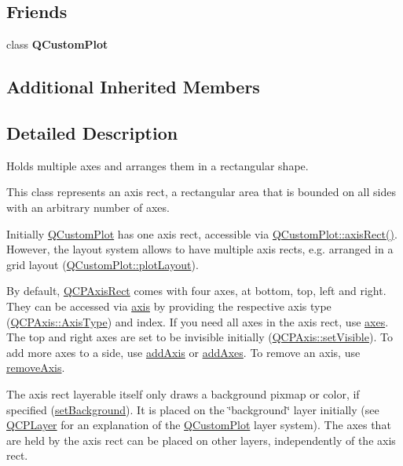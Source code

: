 \subsection*{Friends}
\begin{DoxyCompactItemize}
\item 
\mbox{\label{classQCPAxisRect_a1cdf9df76adcfae45261690aa0ca2198}} 
class {\bfseries Q\+Custom\+Plot}
\end{DoxyCompactItemize}
\subsection*{Additional Inherited Members}


\subsection{Detailed Description}
Holds multiple axes and arranges them in a rectangular shape. 

This class represents an axis rect, a rectangular area that is bounded on all sides with an arbitrary number of axes.

Initially \hyperlink{classQCustomPlot}{Q\+Custom\+Plot} has one axis rect, accessible via \hyperlink{classQCustomPlot_ae5eefcb5f6ca26689b1fd4f6e25b42f9}{Q\+Custom\+Plot\+::axis\+Rect()}. However, the layout system allows to have multiple axis rects, e.\+g. arranged in a grid layout (\hyperlink{classQCustomPlot_af1a1f1f571237deb7c2bd34a5e9f018f}{Q\+Custom\+Plot\+::plot\+Layout}).

By default, \hyperlink{classQCPAxisRect}{Q\+C\+P\+Axis\+Rect} comes with four axes, at bottom, top, left and right. They can be accessed via \hyperlink{classQCPAxisRect_a583ae4f6d78b601b732183f6cabecbe1}{axis} by providing the respective axis type (\hyperlink{classQCPAxis_ae2bcc1728b382f10f064612b368bc18a}{Q\+C\+P\+Axis\+::\+Axis\+Type}) and index. If you need all axes in the axis rect, use \hyperlink{classQCPAxisRect_a8db4722cb93e9c4a6f0d91150c200867}{axes}. The top and right axes are set to be invisible initially (\hyperlink{classQCPLayerable_a3bed99ddc396b48ce3ebfdc0418744f8}{Q\+C\+P\+Axis\+::set\+Visible}). To add more axes to a side, use \hyperlink{classQCPAxisRect_a2dc336092ccc57d44a46194c8a23e4f4}{add\+Axis} or \hyperlink{classQCPAxisRect_a792e1f3d9cb1591fca135bb0de9b81fc}{add\+Axes}. To remove an axis, use \hyperlink{classQCPAxisRect_a03c39cd9704f0d36fb6cf980cdddcbaa}{remove\+Axis}.

The axis rect layerable itself only draws a background pixmap or color, if specified (\hyperlink{classQCPAxisRect_af615ab5e52b8e0a9a0eff415b6559db5}{set\+Background}). It is placed on the \char`\"{}background\char`\"{} layer initially (see \hyperlink{classQCPLayer}{Q\+C\+P\+Layer} for an explanation of the \hyperlink{classQCustomPlot}{Q\+Custom\+Plot} layer system). The axes that are held by the axis rect can be placed on other layers, independently of the axis rect.

